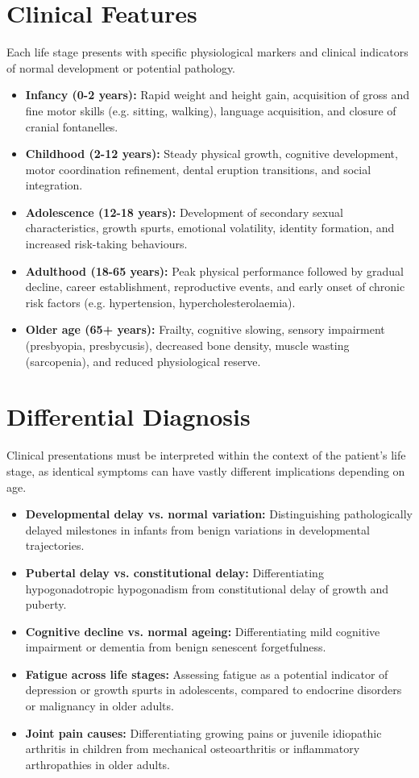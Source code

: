 \section*{Clinical Features}
Each life stage presents with specific physiological markers and clinical indicators of normal development or potential pathology.
\begin{itemize}
    \item \textbf{Infancy (0-2 years):} Rapid weight and height gain, acquisition of gross and fine motor skills (e.g. sitting, walking), language acquisition, and closure of cranial fontanelles.
    \item \textbf{Childhood (2-12 years):} Steady physical growth, cognitive development, motor coordination refinement, dental eruption transitions, and social integration.
    \item \textbf{Adolescence (12-18 years):} Development of secondary sexual characteristics, growth spurts, emotional volatility, identity formation, and increased risk-taking behaviours.
    \item \textbf{Adulthood (18-65 years):} Peak physical performance followed by gradual decline, career establishment, reproductive events, and early onset of chronic risk factors (e.g. hypertension, hypercholesterolaemia).
    \item \textbf{Older age (65+ years):} Frailty, cognitive slowing, sensory impairment (presbyopia, presbycusis), decreased bone density, muscle wasting (sarcopenia), and reduced physiological reserve.
\end{itemize}

\section*{Differential Diagnosis}
Clinical presentations must be interpreted within the context of the patient's life stage, as identical symptoms can have vastly different implications depending on age.
\begin{itemize}
    \item \textbf{Developmental delay vs. normal variation:} Distinguishing pathologically delayed milestones in infants from benign variations in developmental trajectories.
    \item \textbf{Pubertal delay vs. constitutional delay:} Differentiating hypogonadotropic hypogonadism from constitutional delay of growth and puberty.
    \item \textbf{Cognitive decline vs. normal ageing:} Differentiating mild cognitive impairment or dementia from benign senescent forgetfulness.
    \item \textbf{Fatigue across life stages:} Assessing fatigue as a potential indicator of depression or growth spurts in adolescents, compared to endocrine disorders or malignancy in older adults.
    \item \textbf{Joint pain causes:} Differentiating growing pains or juvenile idiopathic arthritis in children from mechanical osteoarthritis or inflammatory arthropathies in older adults.
\end{itemize}

